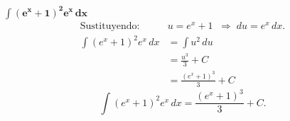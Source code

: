$\displaystyle \mathbf{\int (e^{x} + 1)^{2} e^{x}\,dx}$
\nopagebreak
\begin{align*}
\text{Sustituyendo: } &u = e^{x} + 1 
\;\;\Rightarrow\; du = e^{x}\,dx. \\[6pt]
\int (e^{x} + 1)^{2} e^{x}\,dx 
&= \int u^{2}\,du \\[6pt]
&= \frac{u^{3}}{3} + C \\[6pt]
&= \frac{(e^{x} + 1)^{3}}{3} + C
\end{align*}
\[
\boxed{\displaystyle 
\int (e^{x} + 1)^{2} e^{x}\,dx 
= \frac{(e^{x} + 1)^{3}}{3} + C.}
\]
